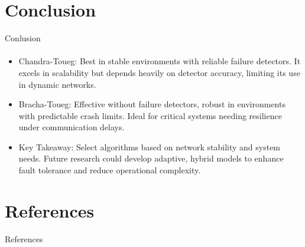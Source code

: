 \documentclass[11pt]{beamer}              %
\begin{document}
\section{Conclusion} %
\begin{frame}{Conlusion}
\framesubtitle{}
\begin{itemize}
\item \alert{Chandra-Toueg:} Best in stable environments with reliable failure detectors. It excels in scalability but depends heavily on detector accuracy, limiting its use in dynamic networks.
\item \alert{Bracha-Toueg:} Effective without failure detectors, robust in environments with predictable crash limits. Ideal for critical systems needing resilience under communication delays.
\item \alert{Key Takeaway:} Select algorithms based on network stability and system needs. Future research could develop adaptive, hybrid models to enhance fault tolerance and reduce operational complexity.
\end{itemize}
\end{frame}


\section*{References}
\begin{frame}{References}
\tiny


\end{frame}


\thankslide
\end{document}
